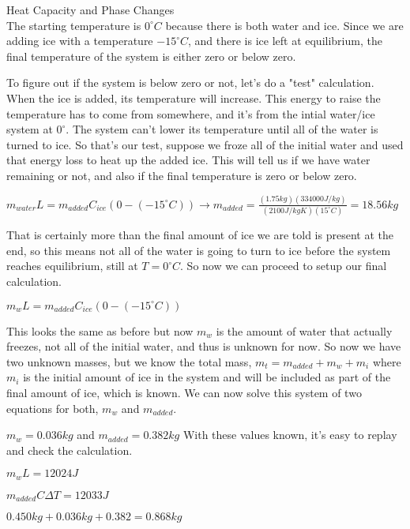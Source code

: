 \documentclass[10pt]{article}
\newenvironment{problem}[2][Problem]{\begin{trivlist}
\item[\hskip \labelsep {\bfseries #1}\hskip \labelsep {\bfseries #2.}]}{\end{trivlist}}
\begin{document}
\begin{problem}{4} Heat Capacity and Phase Changes\\
The starting temperature is $0^\circ C$ because there is both water and ice. Since we are adding ice with a temperature $-15^\circ C$, and there is ice left at equilibrium, the final temperature of the system is either zero or below zero.

\item To figure out if the system is below zero or not, let's do a "test" calculation. When the ice is added, its temperature will increase. This energy to raise the temperature has to come from somewhere, and it's from the intial water/ice system at $0^\circ$. The system can't lower its temperature until all of the water is turned to ice. So that's our test, suppose we froze all of the initial water and used that energy loss to heat up the added ice. This will tell us if we have water remaining or not, and also if the final temperature is zero or below zero.
\item 
$m_{water}L=m_{added}C_{ice}(0 - (-15^\circ C))\rightarrow{} m_{added}=\frac{(1.75kg)(334000J/kg)}{(2100J/kgK)(15^\circ C)}=18.56kg$
\item
That is certainly more than the final amount of ice we are told is present at the end, so this means not all of the water is going to turn to ice before the system reaches equilibrium, still at $T=0^\circ C$. So now we can proceed to setup our final calculation.
\item $m_{w}L=m_{added}C_{ice}(0 - (-15^\circ C))$
\item This looks the same as before but now $m_w$ is the amount of water that actually freezes, not all of the initial water, and thus is unknown for now. So now we have two unknown masses, but we know the total mass, $m_t=m_{added}+m_w+m_i$ where $m_i$ is the initial amount of ice in the system and will be included as part of the final amount of ice, which is known. We can now solve this system of two equations for both, $m_w$ and $m_{added}$.
\item 
$m_w=0.036kg$ and $m_{added}=0.382kg$
With these values known, it's easy to replay and check the calculation.
\item $m_wL=12024J$
\item $m_{added}C\Delta T=12033J$
\item $0.450kg+0.036kg+0.382=0.868kg$
\end{problem}
\end{document}
